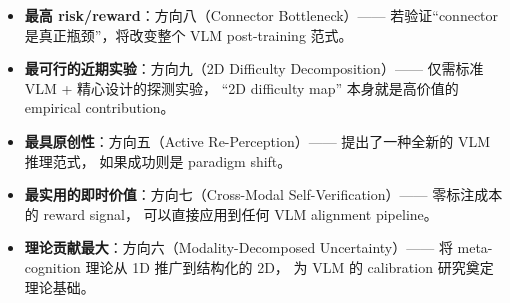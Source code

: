 \documentclass[12pt,a4paper]{article}
\begin{document}
\begin{itemize}[leftmargin=2em]
  \item \textbf{最高 risk/reward}：方向八（Connector Bottleneck）——
    若验证``connector 是真正瓶颈''，将改变整个 VLM post-training 范式。
  \item \textbf{最可行的近期实验}：方向九（2D Difficulty Decomposition）——
    仅需标准 VLM + 精心设计的探测实验，
    ``2D difficulty map'' 本身就是高价值的 empirical contribution。
  \item \textbf{最具原创性}：方向五（Active Re-Perception）——
    提出了一种全新的 VLM 推理范式，
    如果成功则是 paradigm shift。
  \item \textbf{最实用的即时价值}：方向七（Cross-Modal Self-Verification）——
    零标注成本的 reward signal，
    可以直接应用到任何 VLM alignment pipeline。
  \item \textbf{理论贡献最大}：方向六（Modality-Decomposed Uncertainty）——
    将 meta-cognition 理论从 1D 推广到结构化的 2D，
    为 VLM 的 calibration 研究奠定理论基础。
\end{itemize}
\end{document}
